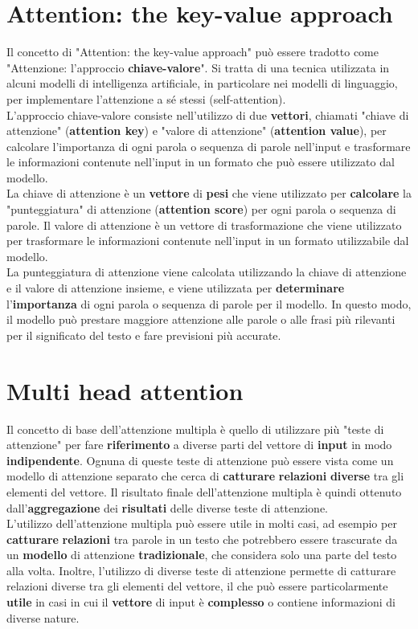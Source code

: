 \documentclass{article}
\begin{document}
\section{Attention: the key-value approach}
Il concetto di "Attention: the key-value approach" può essere tradotto come "Attenzione: l'approccio \textbf{chiave-valore}". Si tratta di una tecnica utilizzata in alcuni modelli di intelligenza artificiale, in particolare nei modelli di linguaggio, per implementare l'attenzione a sé stessi (self-attention).
\\
L'approccio chiave-valore consiste nell'utilizzo di due \textbf{vettori}, chiamati "chiave di attenzione" (\textbf{attention key}) e "valore di attenzione" (\textbf{attention value}), per calcolare l'importanza di ogni parola o sequenza di parole nell'input e trasformare le informazioni contenute nell'input in un formato che può essere utilizzato dal modello.
\\
La chiave di attenzione è un \textbf{vettore} di \textbf{pesi} che viene utilizzato per \textbf{calcolare} la "punteggiatura" di attenzione (\textbf{attention score}) per ogni parola o sequenza di parole. Il valore di attenzione è un vettore di trasformazione che viene utilizzato per trasformare le informazioni contenute nell'input in un formato utilizzabile dal modello.
\\
La punteggiatura di attenzione viene calcolata utilizzando la chiave di attenzione e il valore di attenzione insieme, e viene utilizzata per \textbf{determinare} l'\textbf{importanza} di ogni parola o sequenza di parole per il modello. In questo modo, il modello può prestare maggiore attenzione alle parole o alle frasi più rilevanti per il significato del testo e fare previsioni più accurate.

\section{Multi head attention}
Il concetto di base dell'attenzione multipla è quello di utilizzare più "teste di attenzione" per fare \textbf{riferimento} a diverse parti del vettore di \textbf{input} in modo \textbf{indipendente}. Ognuna di queste teste di attenzione può essere vista come un modello di attenzione separato che cerca di \textbf{catturare} \textbf{relazioni} \textbf{diverse} tra gli elementi del vettore. Il risultato finale dell'attenzione multipla è quindi ottenuto dall'\textbf{aggregazione} dei \textbf{risultati} delle diverse teste di attenzione.
\\
L'utilizzo dell'attenzione multipla può essere utile in molti casi, ad esempio per \textbf{catturare} \textbf{relazioni} tra parole in un testo che potrebbero essere trascurate da un \textbf{modello} di attenzione \textbf{tradizionale}, che considera solo una parte del testo alla volta. Inoltre, l'utilizzo di diverse teste di attenzione permette di catturare relazioni diverse tra gli elementi del vettore, il che può essere particolarmente \textbf{utile} in casi in cui il \textbf{vettore} di input è \textbf{complesso} o contiene informazioni di diverse nature.
\end{document}
